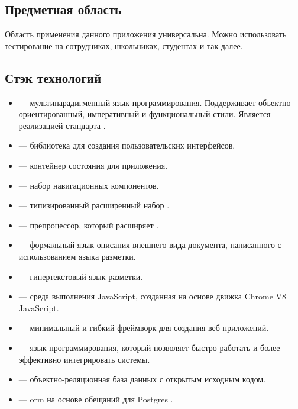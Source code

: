 \subsection{Предметная область}
Область применения данного приложения универсальна. Можно использовать тестирование на сотрудниках, школьниках, студентах и так далее.

\subsection{Стэк технологий}
\begin{itemize}
    \item \textcite{wiki:js} --- мультипарадигменный язык программирования. Поддерживает объектно-ориентированный, императивный и функциональный стили. Является реализацией стандарта \textcite{wiki:es}.
    \item \textcite{react} --- \textcite{wiki:js} библиотека для создания пользовательских интерфейсов.
    \item \textcite{redux} --- контейнер состояния для \textcite{wiki:js} приложения.
    \item \textcite{react-router} --- набор навигационных компонентов.
    \item \textcite{ts} --- типизированный расширенный набор \textcite{wiki:js}.
    \item \textcite{scss} --- препроцессор, который расширяет \textcite{wiki:css}.
    \item \textcite{wiki:css} --- формальный язык описания внешнего вида документа, написанного с использованием языка разметки.
    \item \textcite{wiki:html} --- гипертекстовый язык разметки.
    \item \textcite{node.js} --- среда выполнения JavaScript, созданная на основе движка Chrome V8 JavaScript.
    \item \textcite{express} --- минимальный и гибкий \textcite{node.js} фреймворк для создания веб-приложений.
    \item \textcite{python} --- язык программирования, который позволяет быстро работать и более эффективно интегрировать системы.
    \item \textcite{postgres} --- объектно-реляционная база данных с открытым исходным кодом.
    \item \textcite{seqorm} --- \textcite{node.js} \acrshort{orm} на основе обещаний для Postgres \textcite{postgres}.
\end{itemize}

